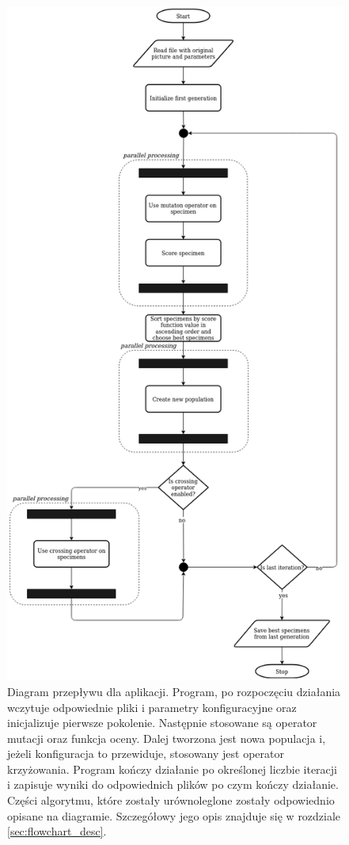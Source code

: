 \begin{figure}
    \centering
    \includegraphics[scale=0.38]{images/other/thesis_flowchart.png}
    \caption{Diagram przepływu dla aplikacji. Program, po rozpoczęciu działania wczytuje odpowiednie pliki i parametry konfiguracyjne oraz inicjalizuje pierwsze pokolenie. Następnie stosowane są operator mutacji oraz funkcja oceny. Dalej tworzona jest nowa populacja i, jeżeli konfiguracja to przewiduje, stosowany jest operator krzyżowania. Program kończy działanie po określonej liczbie iteracji i zapisuje wyniki do odpowiednich plików po czym kończy działanie. Części algorytmu, które zostały urównoleglone zostały odpowiednio opisane na diagramie. Szczegółowy jego opis znajduje się w rozdziale \ref{sec:flowchart_desc}.}
    \label{fig:flowchart}
\end{figure}

